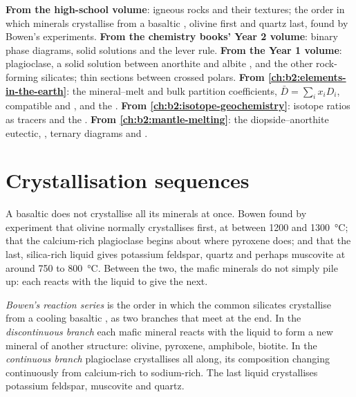 \begin{recall}
\textbf{From the high-school volume}: igneous rocks and their textures; the order
in which minerals crystallise from a basaltic , olivine first and quartz last,
found by Bowen's experiments. \textbf{From the chemistry books' Year 2 volume}:
binary phase diagrams, solid solutions and the lever rule. \textbf{From the Year 1
volume}: plagioclase, a solid solution between anorthite  and albite
, and the other rock-forming silicates; thin sections between crossed
polars. \textbf{From \cref{ch:b2:elements-in-the-earth}}: the mineral--melt and bulk
partition coefficients, $\bar D = \sum_i x_i D_i$, compatible and ,  and the . \textbf{From
\cref{ch:b2:isotope-geochemistry}}: isotope ratios as tracers and the . \textbf{From \cref{ch:b2:mantle-melting}}: the diopside--anorthite
eutectic, , ternary diagrams and .
\end{recall}

\section{Crystallisation sequences}\label{sec:b2:magmatic-differentiation:sequences}

A basaltic  does not crystallise all its minerals at once. Bowen found by
experiment that olivine normally crystallises first, at between 1200 and
\qty{1300}{\celsius}; that the calcium-rich plagioclase begins about where pyroxene
does; and that the last, silica-rich liquid gives potassium feldspar, quartz and
perhaps muscovite at around 750 to \qty{800}{\celsius}. Between the two, the mafic
minerals do not simply pile up: each reacts with the liquid to give the next.

\begin{definition}\label{def:b2:magmatic-differentiation:bowen}
\emph{Bowen's reaction series} is the order in which
the common silicates crystallise from a cooling basaltic , as two branches
that meet at the end. In the \emph{discontinuous branch} each mafic mineral
reacts with the liquid to form a new mineral of another structure: olivine,
pyroxene, amphibole, biotite. In the \emph{continuous branch} plagioclase
crystallises all along, its composition changing continuously from calcium-rich
to sodium-rich. The last liquid crystallises potassium feldspar, muscovite and
quartz.
\end{definition}

